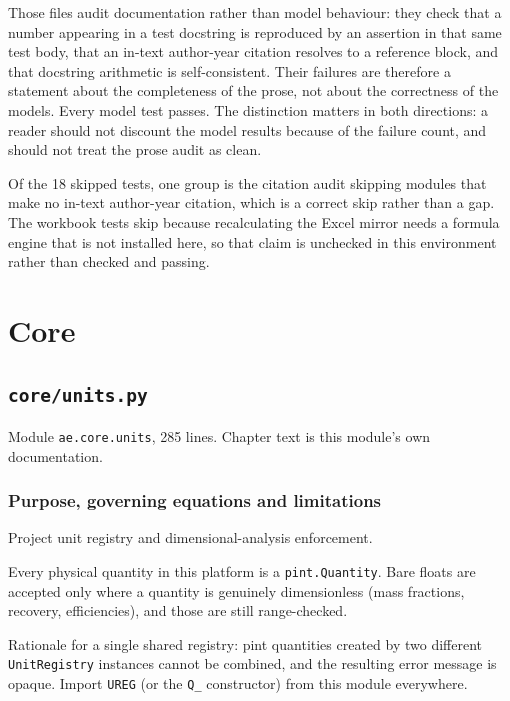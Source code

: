 \documentclass[10pt,a4paper,twoside]{report}
\newcommand{\theblurb}{}
\newcommand{\partblurb}[2]{%
  \renewcommand{\theblurb}{#2}%
  \part{#1}%
  \renewcommand{\theblurb}{}}
\begin{document}
Those files audit documentation rather than model behaviour: they check that a number appearing in a test docstring is reproduced by an assertion in that same test body, that an in-text author-year citation resolves to a reference block, and that docstring arithmetic is self-consistent. Their failures are therefore a statement about the completeness of the prose, not about the correctness of the models. Every model test passes. The distinction matters in both directions: a reader should not discount the model results because of the failure count, and should not treat the prose audit as clean.

Of the 18 skipped tests, one group is the citation audit skipping modules that make no in-text author-year citation, which is a correct skip rather than a gap. The workbook tests skip because recalculating the Excel mirror needs a formula engine that is not installed here, so that claim is unchecked in this environment rather than checked and passing.

\clearpage

\partblurb{Core}{Units, provenance, the parameter registry, and the feedstock and site objects every model takes as input.}

\chapter{\texttt{core/units.py}}\label{ch:units}


{\footnotesize\color{slate}Module \texttt{ae.core.units}, 285 lines. Chapter text is this module's own documentation.\par}

\section{Purpose, governing equations and limitations}

Project unit registry and dimensional-analysis enforcement.

Every physical quantity in this platform is a \texttt{pint.Quantity}. Bare floats are accepted only where a quantity is genuinely dimensionless (mass fractions, recovery, efficiencies), and those are still range-checked.

Rationale for a single shared registry: pint quantities created by two different \texttt{UnitRegistry} instances cannot be combined, and the resulting error message is opaque. Import \texttt{UREG} (or the \texttt{Q\_} constructor) from this module everywhere.
\end{document}
